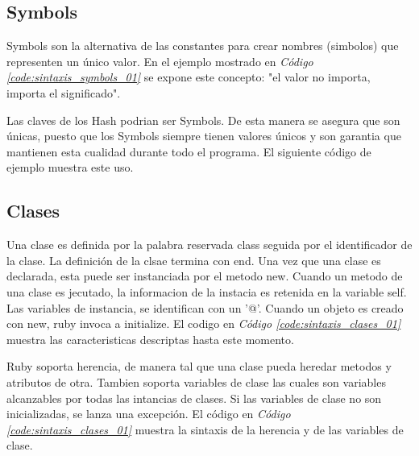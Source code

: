 \documentclass{article}
\newcommand{\refcode}[1]{\textit{Código \ref{#1}}}
\begin{document}
 
\bigskip



\subsection{Symbols}
Symbols son la alternativa de las constantes para crear nombres (simbolos) que representen un único valor.  En el ejemplo mostrado en  \refcode{code:sintaxis_symbols_01}  se expone este concepto: "el valor no importa, importa el significado".

 
\bigskip

Las claves de los Hash podrian ser Symbols. De esta manera se asegura que son únicas, puesto que los Symbols siempre tienen valores únicos y son garantia que mantienen esta cualidad durante todo el programa. El siguiente código de ejemplo muestra este uso.

 
\bigskip



\subsection{Clases}

Una clase es definida por la palabra reservada class seguida por el identificador de la clase. La definición de la clsae termina con end.
Una vez que una clase es declarada, esta puede ser instanciada por el metodo new. 
Cuando un metodo de una clase es jecutado, la informacion de la instacia es retenida en la variable self.
Las variables de instancia, se identifican con un '@'.  
Cuando un objeto es creado con new, ruby invoca a initialize. El codigo  en  \refcode{code:sintaxis_clases_01} muestra las caracteristicas descriptas hasta este momento.

 
\bigskip

Ruby soporta herencia, de manera tal que una clase pueda heredar metodos y atributos de otra. 
Tambien soporta variables de clase las cuales son variables alcanzables por todas las intancias de clases. Si las variables de clase no son inicializadas, se lanza una excepción.  El código  en  \refcode{code:sintaxis_clases_01} muestra la sintaxis de la herencia y de las variables de clase. 
\end{document}
